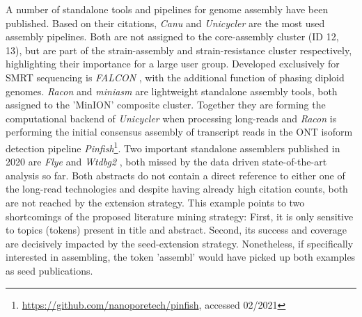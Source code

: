 A number of standalone tools and pipelines for genome assembly have been published.
Based on their citations, \textit{Canu} \cite{Koren2017} and \textit{Unicycler} \cite{Wick2017a} are the most used assembly pipelines. Both are not assigned to the core-assembly cluster (ID 12, 13), but are part of the strain-assembly and strain-resistance cluster respectively, highlighting their importance for a large user group.
Developed exclusively for SMRT sequencing is \textit{FALCON} \cite{Chin2016}, with the additional function of phasing diploid genomes.
\textit{Racon} \cite{Vaser2017} and \textit{miniasm} \cite{Li2016} are lightweight standalone assembly tools, both assigned to the 'MinION' composite cluster. 
Together they are forming the computational backend of \textit{Unicycler} when processing long-reads and \textit{Racon} is performing the initial consensus assembly of transcript reads in the ONT isoform detection pipeline \textit{Pinfish}\footnote{\url{https://github.com/nanoporetech/pinfish}, accessed 02/2021}.
Two important standalone assemblers published in 2020 are \textit{Flye} \cite{Kolmogorov2019} and \textit{Wtdbg2} \cite{Ruan2020}, both missed by the data driven state-of-the-art analysis so far.
Both abstracts do not contain a direct reference to either one of the long-read technologies and despite having already high citation counts, both are not reached by the extension strategy.
This example points to two shortcomings of the proposed literature mining strategy: First, it is only sensitive to topics (tokens) present in title and abstract.
Second, its success and coverage are decisively impacted by the seed-extension strategy.
Nonetheless, if specifically interested in assembling, the token 'assembl' would have picked up both examples as seed publications.

